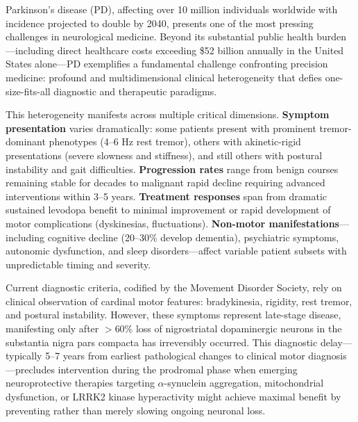 \documentclass[11pt]{article}
\begin{document}
Parkinson's disease (PD), affecting over 10 million individuals worldwide with incidence projected to double by 2040, presents one of the most pressing challenges in neurological medicine\cite{bloem2021parkinson,dorsey2018global}. Beyond its substantial public health burden—including direct healthcare costs exceeding \$52 billion annually in the United States alone—PD exemplifies a fundamental challenge confronting precision medicine: profound and multidimensional clinical heterogeneity that defies one-size-fits-all diagnostic and therapeutic paradigms\cite{espay2024disease}.

This heterogeneity manifests across multiple critical dimensions. \textbf{Symptom presentation} varies dramatically: some patients present with prominent tremor-dominant phenotypes (4--6 Hz rest tremor), others with akinetic-rigid presentations (severe slowness and stiffness), and still others with postural instability and gait difficulties\cite{jankovic1990variable}. \textbf{Progression rates} range from benign courses remaining stable for decades to malignant rapid decline requiring advanced interventions within 3--5 years. \textbf{Treatment responses} span from dramatic sustained levodopa benefit to minimal improvement or rapid development of motor complications (dyskinesias, fluctuations). \textbf{Non-motor manifestations}—including cognitive decline (20--30\% develop dementia), psychiatric symptoms, autonomic dysfunction, and sleep disorders—affect variable patient subsets with unpredictable timing and severity\cite{bloem2021parkinson,chahine2024biomarker}.

Current diagnostic criteria, codified by the Movement Disorder Society\cite{postuma2015mds}, rely on clinical observation of cardinal motor features: bradykinesia, rigidity, rest tremor, and postural instability. However, these symptoms represent late-stage disease, manifesting only after $>$60\% loss of nigrostriatal dopaminergic neurons in the substantia nigra pars compacta has irreversibly occurred\cite{kordower2013disease}. This diagnostic delay—typically 5--7 years from earliest pathological changes to clinical motor diagnosis—precludes intervention during the prodromal phase when emerging neuroprotective therapies targeting $\alpha$-synuclein aggregation, mitochondrial dysfunction, or LRRK2 kinase hyperactivity might achieve maximal benefit by preventing rather than merely slowing ongoing neuronal loss\cite{merchant2024digital,chahine2024biomarker}.
\end{document}
